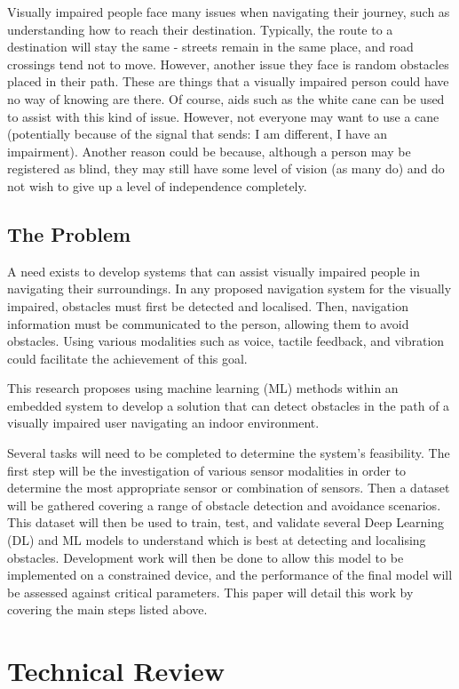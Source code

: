 \documentclass[conference]{IEEEtran}
\begin{document}
Visually impaired people face many issues when navigating their journey, such as understanding how to reach their destination. Typically, the route to a destination will stay the same - streets remain in the same place, and road crossings tend not to move. However, another issue they face is random obstacles placed in their path. These are things that a visually impaired person could have no way of knowing are there. Of course, aids such as the white cane can be used to assist with this kind of issue. However, not everyone may want to use a cane (potentially because of the signal that sends: I am different, I have an impairment). Another reason could be because, although a person may be registered as blind, they may still have some level of vision (as many do) and do not wish to give up a level of independence completely. 

\subsection{The Problem}
A need exists to develop systems that can assist visually impaired people in navigating their surroundings. In any proposed navigation system for the visually impaired, obstacles must first be detected and localised. Then, navigation information must be communicated to the person, allowing them to avoid obstacles. Using various modalities such as voice, tactile feedback, and vibration could facilitate the achievement of this goal.
 
This research proposes using machine learning (ML) methods within an embedded system to develop a solution that can detect obstacles in the path of a visually impaired user navigating an indoor environment. 
 
Several tasks will need to be completed to determine the system's feasibility. The first step will be the investigation of various sensor modalities in order to determine the most appropriate sensor or combination of sensors. Then a dataset will be gathered covering a range of obstacle detection and avoidance scenarios. This dataset will then be used to train, test, and validate several Deep Learning (DL) and ML models to understand which is best at detecting and localising obstacles. Development work will then be done to allow this model to be implemented on a constrained device, and the performance of the final model will be assessed against critical parameters.
This paper will detail this work by covering the main steps listed above. 

\section{Technical Review}
\end{document}
